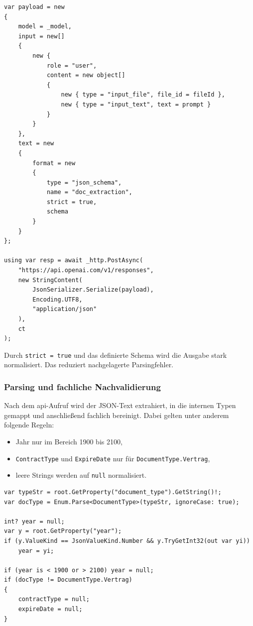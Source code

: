 \begin{lstlisting}[language={[Sharp]C},caption={Schema-gebundener Responses-Aufruf},label={lst:classification-schema-call}]
var payload = new
{
    model = _model,
    input = new[]
    {
        new {
            role = "user",
            content = new object[]
            {
                new { type = "input_file", file_id = fileId },
                new { type = "input_text", text = prompt }
            }
        }
    },
    text = new
    {
        format = new
        {
            type = "json_schema",
            name = "doc_extraction",
            strict = true,
            schema
        }
    }
};

using var resp = await _http.PostAsync(
    "https://api.openai.com/v1/responses",
    new StringContent(
        JsonSerializer.Serialize(payload),
        Encoding.UTF8,
        "application/json"
    ),
    ct
);
\end{lstlisting}

Durch \texttt{strict = true} und das definierte Schema wird die Ausgabe stark normalisiert. Das reduziert nachgelagerte Parsingfehler.

\subsubsection{Parsing und fachliche Nachvalidierung}

Nach dem \acrshort{api}-Aufruf wird der JSON-Text extrahiert, in die internen Typen gemappt und anschließend fachlich bereinigt. Dabei gelten unter anderem folgende Regeln:
\begin{itemize}
    \item Jahr nur im Bereich 1900 bis 2100,
    \item \texttt{ContractType} und \texttt{ExpireDate} nur für \texttt{DocumentType.Vertrag},
    \item leere Strings werden auf \texttt{null} normalisiert.
\end{itemize}

\begin{lstlisting}[language={[Sharp]C},caption={Nachvalidierung der Klassifikationsergebnisse},label={lst:classification-post-validation}]
var typeStr = root.GetProperty("document_type").GetString()!;
var docType = Enum.Parse<DocumentType>(typeStr, ignoreCase: true);

int? year = null;
var y = root.GetProperty("year");
if (y.ValueKind == JsonValueKind.Number && y.TryGetInt32(out var yi))
    year = yi;

if (year is < 1900 or > 2100) year = null;
if (docType != DocumentType.Vertrag)
{
    contractType = null;
    expireDate = null;
}
\end{lstlisting}

